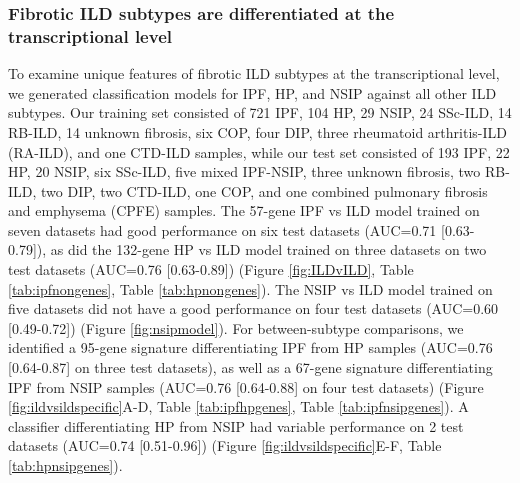 \documentclass[
]{article}
\begin{document}
\hypertarget{fibrotic-ild-subtypes-are-differentiated-at-the-transcriptional-level}{%
\subsubsection{Fibrotic ILD subtypes are differentiated at the transcriptional level}\label{fibrotic-ild-subtypes-are-differentiated-at-the-transcriptional-level}}

To examine unique features of fibrotic ILD subtypes at the transcriptional level, we generated classification models for IPF, HP, and NSIP against all other ILD subtypes. Our training set consisted of 721 IPF, 104 HP, 29 NSIP, 24 SSc-ILD, 14 RB-ILD, 14 unknown fibrosis, six COP, four DIP, three rheumatoid arthritis-ILD (RA-ILD), and one CTD-ILD samples, while our test set consisted of 193 IPF, 22 HP, 20 NSIP, six SSc-ILD, five mixed IPF-NSIP, three unknown fibrosis, two RB-ILD, two DIP, two CTD-ILD, one COP, and one combined pulmonary fibrosis and emphysema (CPFE) samples. The 57-gene IPF vs ILD model trained on seven datasets had good performance on six test datasets (AUC=0.71 {[}0.63-0.79{]}), as did the 132-gene HP vs ILD model trained on three datasets on two test datasets (AUC=0.76 {[}0.63-0.89{]}) (Figure \ref{fig:ILDvILD}, Table \ref{tab:ipfnongenes}, Table \ref{tab:hpnongenes}). The NSIP vs ILD model trained on five datasets did not have a good performance on four test datasets (AUC=0.60 {[}0.49-0.72{]}) (Figure \ref{fig:nsipmodel}). For between-subtype comparisons, we identified a 95-gene signature differentiating IPF from HP samples (AUC=0.76 {[}0.64-0.87{]} on three test datasets), as well as a 67-gene signature differentiating IPF from NSIP samples (AUC=0.76 {[}0.64-0.88{]} on four test datasets) (Figure \ref{fig:ildvsildspecific}A-D, Table \ref{tab:ipfhpgenes}, Table \ref{tab:ipfnsipgenes}). A classifier differentiating HP from NSIP had variable performance on 2 test datasets (AUC=0.74 {[}0.51-0.96{]}) (Figure \ref{fig:ildvsildspecific}E-F, Table \ref{tab:hpnsipgenes}).
\end{document}
